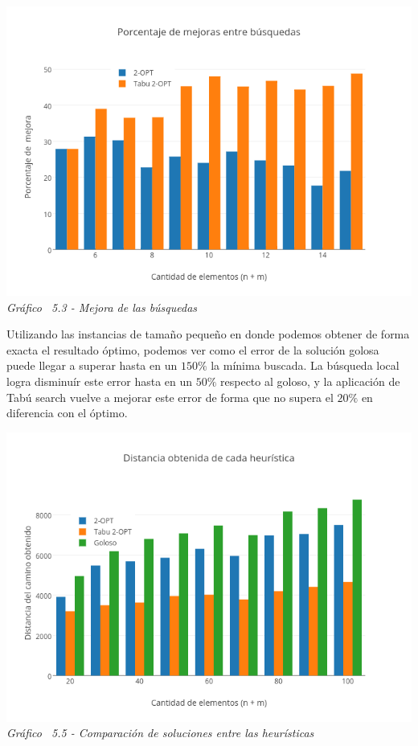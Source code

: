   \vspace*{0.3cm} \vspace*{0.3cm}
  \begin{center}
 \includegraphics[scale=0.5]{./EJ5/mejoraChico.png}\\
 {\textit{Gráfico \ 5.3 - Mejora de las búsquedas}}
  \end{center}
  \vspace*{0.3cm}

Utilizando las instancias de tamaño pequeño en donde podemos obtener de forma exacta el resultado óptimo, podemos ver como el error de la solución golosa puede llegar a superar hasta en un $150\%$ la mínima buscada. La búsqueda local logra disminuír este error hasta en un $50\%$ respecto al goloso, y la aplicación de Tabú search vuelve a mejorar este error de forma que no supera el $20\%$ en diferencia con el óptimo.


\vspace*{0.3cm} \vspace*{0.3cm}
  \begin{center}
 \includegraphics[scale=0.5]{./EJ5/comparativo1.png}\\
 {\textit{Gráfico \ 5.5 - Comparaci\'on de soluciones entre las heur\'isticas}}
  \end{center}
  \vspace*{0.3cm}
  
